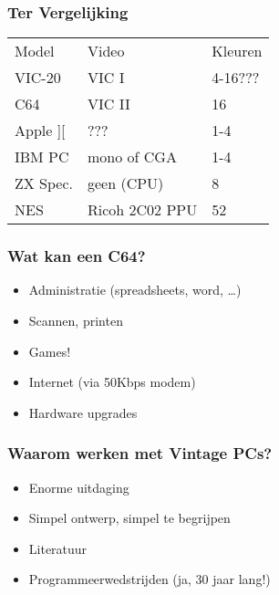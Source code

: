 \documentclass[aspectratio=43]{uva-inf-presentation}
\begin{document}

\begin{frame}
\frametitle{Ter Vergelijking}

\begin{tabular}{|l|l|l|}
\hline Model & Video & Kleuren \\
VIC-20 & VIC I & 4-16??? \\
C64 & VIC II & 16 \\
Apple ][ & ??? & 1-4 \\
IBM PC & mono of CGA & 1-4 \\
ZX Spec. & geen (CPU) & 8 \\ \hline
NES & Ricoh 2C02 PPU & 52 \\ \hline
\end{tabular}

\end{frame}


\begin{frame}
\frametitle{Wat kan een C64?}

\begin{itemize}
\item Administratie (spreadsheets, word, \dots)
\item Scannen, printen
\item Games!
\item Internet (via 50Kbps modem)
\item Hardware upgrades
\end{itemize}

\end{frame}


\begin{frame}
\frametitle{Waarom werken met Vintage PCs?}

\begin{itemize}
\item Enorme uitdaging
\item Simpel ontwerp, simpel te begrijpen
\item Literatuur
\item Programmeerwedstrijden (ja, 30 jaar lang!)
\end{itemize}

\end{frame}

\end{document}
